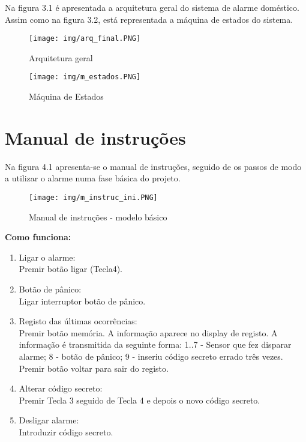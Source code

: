 \documentclass{report}
\begin{document}
Na figura 3.1 é apresentada a arquitetura geral do sistema de alarme doméstico. Assim como na figura 3.2, está representada a máquina de estados do sistema.

	\begin{figure} [t]
		\centering
		\texttt{[image: img/arq\_final.PNG]}
		\caption{Arquitetura geral}
	\end{figure}

	\begin{figure} [h]
		\centering
		\texttt{[image: img/m\_estados.PNG]}
		\caption{Máquina de Estados}
	\end{figure}

	
	
\chapter{Manual de instruções}
\label{chap.M_Instr}
	
	Na figura 4.1 apresenta-se o manual de instruções, seguido de os passos de modo a utilizar o alarme numa fase básica do projeto.  
	
	\begin{figure} [h]
		\centering
		\texttt{[image: img/m\_instruc\_ini.PNG]}
		\caption{Manual de instruções - modelo básico}
	\end{figure}

\newpage
	
	\textbf{Como funciona:}
	\begin{enumerate}
 		\item Ligar o alarme:\\
 		Premir botão ligar (Tecla4).
 		
 		\item Botão de pânico:\\
 		Ligar interruptor botão de pânico. 
 		
 		\item Registo das últimas ocorrências:\\
 		Premir botão memória. A informação aparece no display de registo. 
 		A informação é transmitida da seguinte forma:
 		1..7 - Sensor que fez disparar alarme;
 		8 - botão de pânico;
 		9 - inseriu código secreto errado três vezes. 	
 		Premir botão voltar para sair do registo.
 		
 		\item Alterar código secreto:\\
 		Premir Tecla 3 seguido de Tecla 4 e depois o novo código secreto.
 		
 		\item Desligar alarme:\\
 		Introduzir código secreto. 		
	\end{enumerate}	
	
\end{document}
